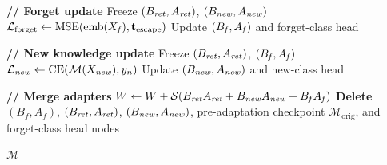 \begin{algorithm}[!htbp]
\begin{algorithmic}[1]
        \State \textbf{// Forget update}
        \State Freeze $(B_{\text{\textit{ret}}}, A_{\text{\textit{ret}}})$, $(B_{\text{\textit{new}}}, A_{\text{\textit{new}}})$
        \State $\mathcal{L}_{\text{forget}} \gets \text{MSE}(\text{emb}(X_\text{\textit{f}}), \mathbf{t}_{\text{escape}})$
        \State Update $(B_{\text{\textit{f}}}, A_{\text{\textit{f}}})$ and forget-class head
        
        \State \textbf{// New knowledge update}
        \State Freeze $(B_{\text{\textit{ret}}}, A_{\text{\textit{ret}}})$, $(B_{\text{\textit{f}}}, A_{\text{\textit{f}}})$
        \State $\mathcal{L}_{\text{\textit{new}}} \gets \text{CE}(\mathcal{M}(X_\text{\textit{new}}), y_n)$
        \State Update $(B_{\text{\textit{new}}}, A_{\text{\textit{new}}})$ and new-class head
    \EndFor
\EndFor

\State \textbf{// Merge adapters}
\State $W \gets W + \mathcal{S}(B_{\text{\textit{ret}}}A_{\text{\textit{ret}}} + B_{\text{\textit{new}}}A_{\text{\textit{new}}} + B_{\text{\textit{f}}}A_{\text{\textit{f}}})$
\State \textbf{Delete} $(B_f, A_f)$, $(B_\text{\textit{ret}}, A_\text{\textit{ret}})$, $(B_\text{\textit{new}}, A_\text{\textit{new}})$, pre-adaptation checkpoint $\mathcal{M}_\text{orig}$, and forget-class head nodes

\State \Return $\mathcal{M}$
\end{algorithmic}
\end{algorithm}
